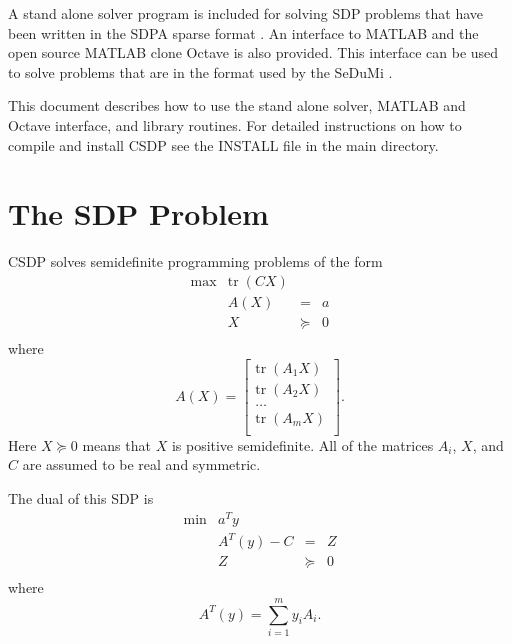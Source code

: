 \documentclass{article}
\begin{document}
A stand alone solver program is included for solving SDP problems that
have been written in the SDPA sparse format \cite{SDPA}.  An interface
to MATLAB and the open source MATLAB clone Octave is also provided.
This interface can be used to solve problems that are in the format
used by the SeDuMi \cite{SturmJF:UsiS1M}.

This document describes how to use the stand alone solver, MATLAB and
Octave interface, and library routines.  For detailed instructions on
how to compile and install CSDP see the INSTALL file in the main
directory.

\clearpage
\section*{The SDP Problem}
CSDP solves semidefinite programming problems of the form
\begin{equation}
\begin{array}{rrcl}
\max  & \mbox{tr}\; (CX) & & \\
      & A(X) & = & a \\
      & X                   & \succeq & 0 \\
\end{array}
\end{equation}
where 
\begin{equation}
A(X)=\left[
\begin{array}{c}
\mbox{tr} \; (A_{1} X) \\
\mbox{tr} \; (A_{2} X) \\
\ldots \\
\mbox{tr} \; (A_{m} X) \\
\end{array}
\right].
\end{equation}
Here $X \succeq 0$ means that $X$ is positive semidefinite.  All of
the matrices $A_{i}$, $X$, and $C$ are assumed to be
real and symmetric.

The dual of this SDP is
\begin{equation}
\begin{array}{rrcl}
\min  & a^{T}y  & & \\
      & A^{T}(y)-C & = & Z \\
      & Z                   & \succeq & 0 \\
\end{array}
\end{equation}
where
\begin{equation}
A^{T}(y)=\sum_{i=1}^{m} y_{i}A_{i}.
\end{equation}
\end{document}
